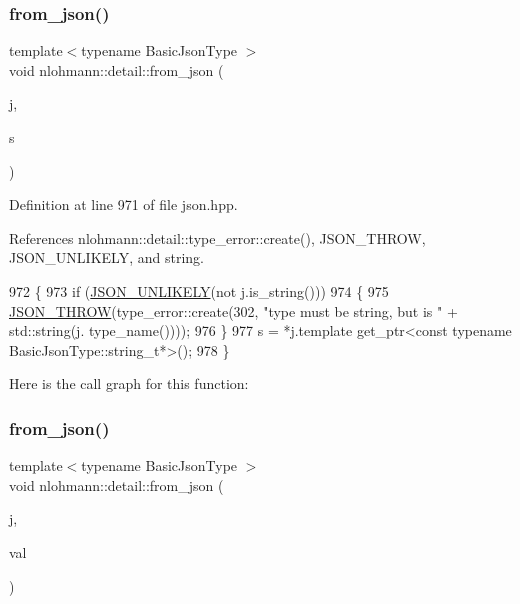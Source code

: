 \subsubsection{\texorpdfstring{from\+\_\+json()}{from\_json()}\hspace{0.1cm}{\footnotesize\ttfamily [2/14]}}
{\footnotesize\ttfamily template$<$typename Basic\+Json\+Type $>$ \\
void nlohmann\+::detail\+::from\+\_\+json (\begin{DoxyParamCaption}\item[{const Basic\+Json\+Type \&}]{j,  }\item[{typename Basic\+Json\+Type\+::string\+\_\+t \&}]{s }\end{DoxyParamCaption})}



Definition at line 971 of file json.\+hpp.



References nlohmann\+::detail\+::type\+\_\+error\+::create(), J\+S\+O\+N\+\_\+\+T\+H\+R\+OW, J\+S\+O\+N\+\_\+\+U\+N\+L\+I\+K\+E\+LY, and string.


\begin{DoxyCode}
972 \{
973     \textcolor{keywordflow}{if} (\hyperlink{json_8hpp_ab77582407c64944e7db1ea95ab520253}{JSON\_UNLIKELY}(not j.is\_string()))
974     \{
975         \hyperlink{json_8hpp_a6c274f6db2e65c1b66c7d41b06ad690f}{JSON\_THROW}(type\_error::create(302, \textcolor{stringliteral}{"type must be string, but is "} + std::string(j.
      type\_name())));
976     \}
977     s = *j.template get\_ptr<const typename BasicJsonType::string\_t*>();
978 \}
\end{DoxyCode}
Here is the call graph for this function\+:
\mbox{\label{namespacenlohmann_1_1detail_a7cb5dd7d46a60e65f9a8e0873b3f7dd8}} 
\subsubsection{\texorpdfstring{from\+\_\+json()}{from\_json()}\hspace{0.1cm}{\footnotesize\ttfamily [3/14]}}
{\footnotesize\ttfamily template$<$typename Basic\+Json\+Type $>$ \\
void nlohmann\+::detail\+::from\+\_\+json (\begin{DoxyParamCaption}\item[{const Basic\+Json\+Type \&}]{j,  }\item[{typename Basic\+Json\+Type\+::number\+\_\+float\+\_\+t \&}]{val }\end{DoxyParamCaption})}



